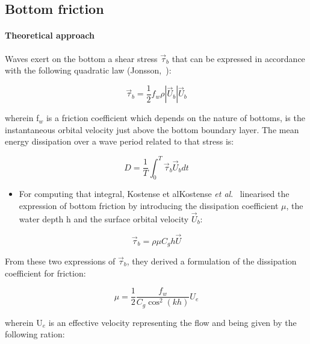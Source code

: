 \subsection{Bottom friction}


\paragraph{Theoretical approach}

Waves exert on the bottom a shear stress $\overrightarrow{\tau}_{b}$ that can
be expressed in accordance with the following quadratic law
(Jonsson,~\cite{Jonsson1966}):

\begin{equation}
  \overrightarrow{\tau}_{b} = \frac{1}{2}f_w\rho|\overrightarrow{U}_b|\overrightarrow{U}_b
  \label{eq:3.49}
\end{equation}

wherein f${}_{w}$ is a friction coefficient which depends on the
nature of bottoms, is the instantaneous orbital velocity just above the bottom
boundary layer. The mean energy dissipation over a wave period related to that
stress is:

\begin{equation}
  D = \frac{1}{T} \int_0^T\overrightarrow{\tau}_{b}\overrightarrow{U}_b dt
  \label{eq:3.50}
\end{equation}

\begin{itemize}
\item  For computing that integral,  Kostense et alKostense \textit{et
  al}.~\cite{Kostense1986} linearised the expression of bottom friction by
    introducing the dissipation coefficient $\mu$, the water depth h and the
    surface orbital velocity $\overrightarrow{U}_b$:
\end{itemize}

\begin{equation}
  \overrightarrow{\tau}_{b} = \rho\mu C_g h\overrightarrow{U}
  \label{eq:3.51}
\end{equation}

From these two expressions of $\overrightarrow{\tau}_{b}$, they derived a
formulation of the dissipation coefficient for friction:

\begin{equation}
  \mu = \frac{1}{2}\frac{f_w}{C_g \cos^2 (kh)}U_e
  \label{eq:3.52}
\end{equation}

wherein U${}_{e}$ is an effective velocity representing the flow and being
given by the following ration:

